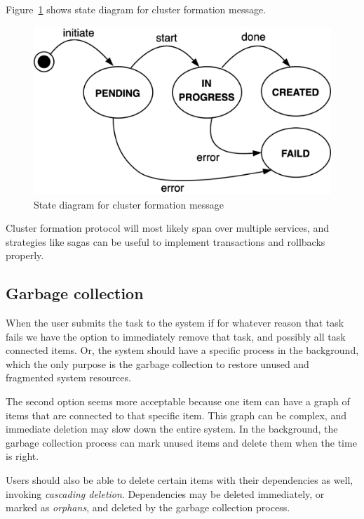 Figure~\ref{fig:fig19} shows state diagram for cluster formation message.

\begin{figure}[H]
	\begin{center}
		\includegraphics[scale=1]{images/Figure19}
	\end{center}
	\vspace{-0.6cm}
	\caption{State diagram for cluster formation message}
	\label{fig:fig19}
\end{figure}

Cluster formation protocol will most likely span over multiple services, and strategies like sagas can be useful to implement transactions and rollbacks properly.
%
%
\subsection{Garbage collection}\label{sec:garbage}
%
When the user submits the task to the system if for whatever reason that task fails we have the option to immediately remove that task, and possibly all task connected items. Or, the system should have a specific process in the background, which the only purpose is the garbage collection to restore unused and fragmented system resources.

The second option seems more acceptable because one item can have a graph of items that are connected to that specific item. This graph can be complex, and immediate deletion may slow down the entire system. In the background, the garbage collection process can mark unused items and delete them when the time is right.

Users should also be able to delete certain items with their dependencies as well, invoking \emph{cascading deletion}. Dependencies may be deleted immediately, or marked as \emph{orphans}, and deleted by the garbage collection process.

